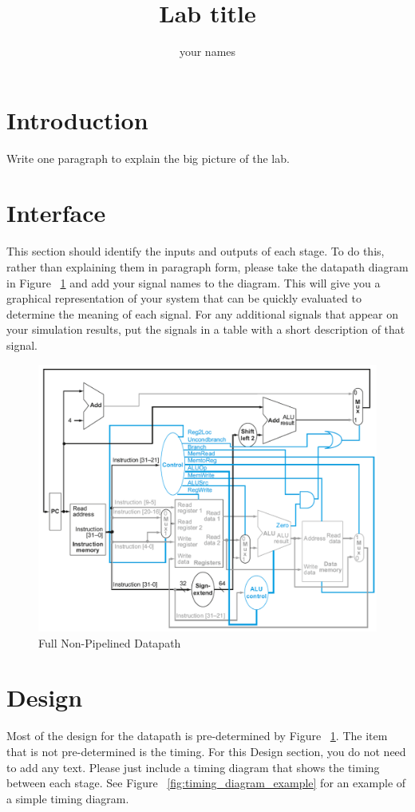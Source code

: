 \documentclass{article}
\author{your names}
\title{Lab title}
\begin{document}
\maketitle

\section{Introduction}
Write one paragraph to explain the big picture of the lab.

\section{Interface}
This section should identify the inputs and outputs of each stage.  To do this, rather than explaining them in paragraph form, please take the datapath diagram in Figure ~\ref{fig:datapath} and add your signal names to the diagram.  This will give you a graphical representation of your system that can be quickly evaluated to determine the meaning of each signal.  For any additional signals that appear on your simulation results, put the signals in a table with a short description of that signal.

\begin{figure}
	\caption{Full Non-Pipelined Datapath}\label{fig:datapath}
	\begin{center}
		\includegraphics[width=\textwidth]{../images/non_pipelined_datapath.png}
	\end{center}
\end{figure}

\section{Design}
Most of the design for the datapath is pre-determined by Figure ~\ref{fig:datapath}.  The item that is not pre-determined is the timing.  For this Design section, you do not need to add any text.  Please just include a timing diagram that shows the timing between each stage.  See Figure ~\ref{fig:timing_diagram_example} for an example of a simple timing diagram.
\end{document}
